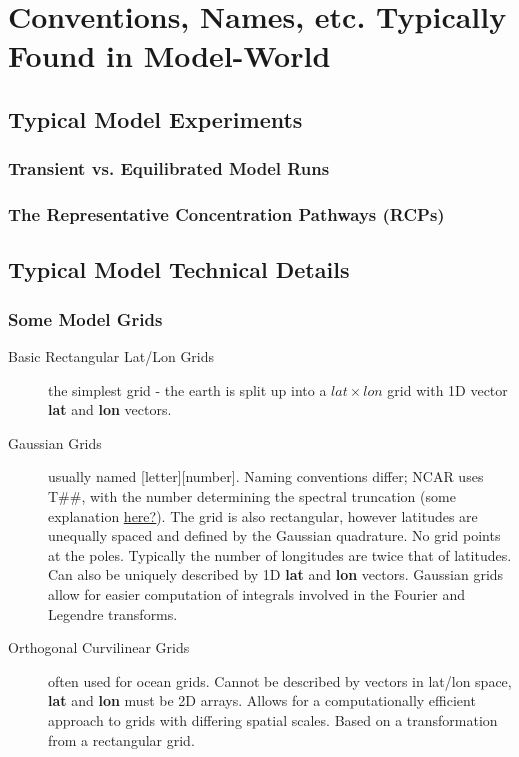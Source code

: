 \documentclass{article}
\begin{document}
\appendix
\section{Conventions, Names, etc. Typically Found in Model-World}
\subsection{Typical Model Experiments}
\subsubsection{Transient vs. Equilibrated Model Runs}


\subsubsection{The Representative Concentration Pathways (RCPs)}


\subsection{Typical Model Technical Details}

\subsubsection{Some Model Grids}
\begin{description}
\item [Basic Rectangular Lat/Lon Grids] the simplest grid - the earth is split up into a $lat\times lon$ grid with 1D vector \textbf{lat} and \textbf{lon} vectors. 
\item [Gaussian Grids] usually named [letter][number]. Naming conventions differ; NCAR uses T\#\#, with the number determining the spectral truncation (some explanation  \href{https://software.ecmwf.int/wiki/display/FCST/Relationship+between+spectral+truncation+and+grid+point+resolution}{\underline{here?}}). The grid is also rectangular, however latitudes are unequally spaced and defined by the Gaussian quadrature. No grid points at the poles. Typically the number of longitudes are twice that of latitudes. Can also be uniquely described by 1D \textbf{lat} and \textbf{lon} vectors. Gaussian grids allow for easier computation of integrals involved in the Fourier and Legendre transforms. 
\item [Orthogonal Curvilinear Grids] often used for ocean grids. Cannot be described by vectors in lat/lon space, \textbf{lat} and \textbf{lon} must be 2D arrays. Allows for a computationally efficient approach to grids with differing spatial scales. Based on a transformation from a rectangular grid. 
\end{description}
\end{document}
